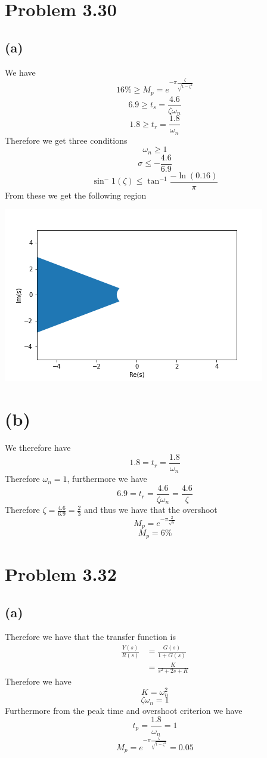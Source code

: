 \documentclass[12pt]{article}
\begin{document}
\section*{Problem 3.30}
\subsection*{(a)}
We have
$$16\%\geq M_p=e^{-\pi\frac{\zeta}{\sqrt{1-\zeta^2}}}$$
$$6.9\geq t_s=\frac{4.6}{\zeta \omega_n}$$
$$1.8\geq t_r=\frac{1.8}{\omega_n}$$
Therefore we get three conditions
$$\omega_n\geq1$$
$$\sigma\leq-\frac{4.6}{6.9}$$
$$\sin^-1(\zeta)\leq\tan^{-1}\frac{-\ln(0.16)}{\pi}$$
From these we get the following region

\includegraphics[scale=.5]{Problem2.png}
\FloatBarrier
\section*{(b)}
We therefore have
$$1.8=t_r=\frac{1.8}{\omega_n}$$
Therefore $\omega_n=1$, furthermore we have
$$6.9=t_r=\frac{4.6}{\zeta \omega_n}=\frac{4.6}{\zeta}$$
Therefore $\zeta=\frac{4.6}{6.9}=\frac{2}{3}$ and thus we have that the overshoot
$$M_p=e^{-\pi \frac{2}{\sqrt{5}}}$$
$$M_p=6\%$$
\section*{Problem 3.32}
\subsection*{(a)}
Therefore we have that the transfer function is 
\begin{align*}
    \frac{Y(s)}{R(s)}&=\frac{G(s)}{1+G(s)}\\
    &=\frac{K}{s^2+2s+K}
\end{align*}
Therefore we have
$$K=\omega_n^2$$
$$\zeta\omega_n=1$$
Furthermore from the peak time and overshoot criterion we have
$$t_p=\frac{1.8}{\omega_n}=1$$
$$M_p=e^{-\pi\frac{\zeta}{\sqrt{1-\zeta^2}}}=0.05$$
\end{document}
